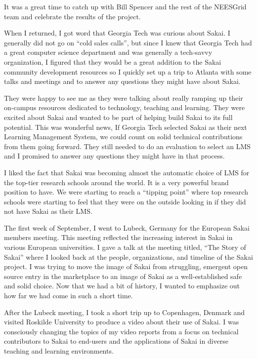 \documentclass[12pt]{book}
\begin{document}
It was a great time to catch up with Bill Spencer
and the rest of the NEESGrid team and celebrate
the results of the project.


When I returned, I got word that Georgia Tech
was curious about Sakai.   I generally did not go
on ``cold sales calls'', but since I knew that
Georgia Tech had a great computer science department
and was generally a tech-savvy organization,
I figured that they would be a great addition
to the Sakai community development resources
so I quickly set up a trip
to Atlanta with some talks and meetings
and to answer any questions they
might have about Sakai.

They were happy to see me as they were talking about
really ramping up their on-campus resources dedicated
to technology, teaching and learning.  They were
excited about Sakai and wanted to be part of helping
build Sakai to its full potential.  This was wonderful
news, If Georgia Tech selected Sakai as their next
Learning Management System, we could count on
solid technical contributions from them going
forward.  They still needed to do an evaluation
to select an LMS and I promised to answer any questions
they might have in that process.

I liked the fact that Sakai was becoming
almost the automatic choice of LMS for the top-tier
research schools around the world.  It is a very
powerful brand position to have.  We were
starting to reach a ``tipping point'' where top
research schools were starting to feel that they were
on the outside looking in if they did not have Sakai
as their LMS.


The first week of September, I went to Lubeck, Germany
for the European Sakai members meeting.  This meeting
reflected the increasing interest in Sakai in various
European universities.  I gave a talk at the
meeting titled, ``The Story of Sakai'' where I looked
back at the people, organizations, and timeline of the
Sakai project.  I was trying to move the image of Sakai
from struggling, emergent open source entry in the
marketplace to an image of Sakai as a well-established
safe and solid choice.  Now that we had a bit of history,
I wanted to emphasize out how far we had come in such
a short time.


After the Lubeck meeting, I took a short trip up to
Copenhagen, Denmark and visited Roskilde University
to produce a video about their use of Sakai.  I was
consciously changing the topics of my video reports
from a focus on technical contributors to Sakai to
end-users and the applications of Sakai in diverse
teaching and learning environments.
\end{document}
